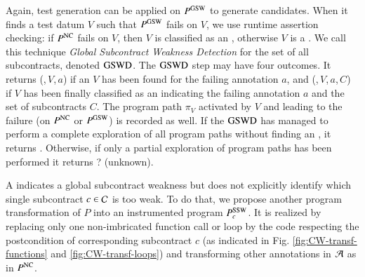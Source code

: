 Again, test generation can be applied on  $P^{\mathrm{GSW}}$ to generate
\GSWCE candidates. When it finds a test datum $V$ such that 
$P^{\mathrm{GSW}}$ fails on $V$, we use runtime assertion checking:
if $P^{\mathrm{NC}}$ fails on $V$, then
$V$ is classified as an \NCCE, otherwise  $V$ is a \GSWCE.
We call this technique \emph{Global Subcontract Weakness Detection} for the set of 
all subcontracts, denoted $\mathrm{GSWD}$. 
The $\mathrm{GSWD}$ step may have four outcomes.
It returns (\nc,\,$V$,\,$a$) if an \NCCE $V$ has been found for the failing
annotation $a$,
and  (\cw,\,$V$,\,$a$,\,$C$) if $V$ has been finally classified as an \SWCE
indicating the failing annotation $a$ and the set of subcontracts $C$.
The program path $\pi_V$ activated by $V$ and leading to the failure 
(on $P^{\mathrm{NC}}$ or $P^{\mathrm{GSW}}$) is recorded as well.
If the $\mathrm{GSWD}$ has managed to perform a complete exploration 
of all program paths without finding an \GSWCE, it returns \no.
Otherwise, if only a partial exploration of program paths
has been performed it returns \textsf{?} (unknown).




A \GSWCE indicates a global subcontract weakness but
does not explicitly identify which single subcontract $c\in{\ensuremath\mathcal{C}}$ is too 
weak.
To do that, we propose another program transformation of $P$ into
an instrumented program  $P_c^{\mathrm{SSW}}$.
It is realized by replacing only one non-imbricated function call or loop 
by the code respecting the postcondition of corresponding subcontract $c$ 
(as indicated in Fig. \ref{fig:CW-transf-functions} and \ref{fig:CW-transf-loops})
and transforming other annotations in ${\mathcal{A}}$ as in $P^{\mathrm{NC}}$.


